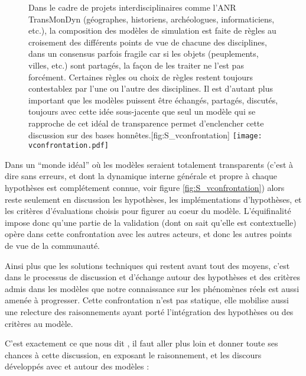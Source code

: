 \begin{figure}[htbp]
\begin{sidecaption}[fortoc]{Dans le cadre de projets interdisciplinaires comme l'ANR TransMonDyn (géographes, historiens, archéologues, informaticiens, etc.), la composition des modèles de simulation est faite de règles au croisement des différents points de vue de chacune des disciplines, dans un consensus parfois fragile car si les objets (peuplements, villes, etc.) sont partagés, la façon de les traiter ne l'est pas forcément. Certaines règles ou choix de règles restent toujours contestablez par l’une ou l’autre des disciplines. Il est d’autant plus important que les modèles puissent être échangés, partagés, discutés, toujours avec cette idée sous-jacente que seul un modèle qui se rapproche de cet idéal de transparence permet d’enclencher cette discussion sur des bases honnêtes.}[fig:S_vconfrontation]
  \centering
 \texttt{[image: vconfrontation.pdf]}
  \end{sidecaption}
\end{figure}

Dans un \enquote{monde idéal} où les modèles seraient totalement transparents (c'est à dire sans erreurs, et dont la dynamique interne générale et propre à chaque hypothèses est complétement connue, voir figure \ref{fig:S_vconfrontation}) alors reste seulement en discussion les hypothèses, les implémentations d'hypothèses, et les critères d’évaluations choisis pour figurer au coeur du modèle. L’équifinalité impose donc qu’une partie de la validation (dont on sait qu’elle est contextuelle) opère dans cette confrontation avec les autres acteurs, et donc les autres points de vue de la communauté. 

Ainsi plus que les solutions techniques qui restent avant tout des moyens, c'est dans le processus de discussion et d'échange autour des hypothèses et des critères admis dans les modèles que notre connaissance sur les phénomènes réels est aussi amenée à progresser. Cette confrontation n'est pas statique, elle mobilise aussi une relecture des raisonnements ayant porté l'intégration des hypothèses ou des critères au modèle. %

C'est exactement ce que nous dit \textcites{OSullivan2004,Millington2012}, il faut aller plus loin et donner toute ses chances à cette discussion, en exposant le raisonnement, et les discours développés avec et autour des modèles : 

